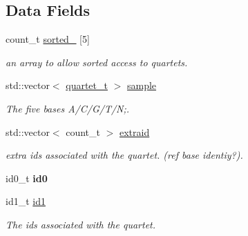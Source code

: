 \subsection*{Data Fields}
\begin{DoxyCompactItemize}
\item 
\hypertarget{classLocus_aa7e193d4069c91af62caf73cca14bb4a}{count\-\_\-t \hyperlink{classLocus_aa7e193d4069c91af62caf73cca14bb4a}{sorted\-\_\-} \mbox{[}5\mbox{]}}\label{classLocus_aa7e193d4069c91af62caf73cca14bb4a}

\begin{DoxyCompactList}\small\item\em an array to allow sorted access to quartets. \end{DoxyCompactList}\item 
\hypertarget{classLocus_aa80d7ff11dd7cffa958016494084f102}{std\-::vector$<$ \hyperlink{structquartet}{quartet\-\_\-t} $>$ \hyperlink{classLocus_aa80d7ff11dd7cffa958016494084f102}{sample}}\label{classLocus_aa80d7ff11dd7cffa958016494084f102}

\begin{DoxyCompactList}\small\item\em The five bases A/\-C/\-G/\-T/\-N;. \end{DoxyCompactList}\item 
\hypertarget{classLocus_a585fb7981a75e033fd9d74f86e9f7914}{std\-::vector$<$ count\-\_\-t $>$ \hyperlink{classLocus_a585fb7981a75e033fd9d74f86e9f7914}{extraid}}\label{classLocus_a585fb7981a75e033fd9d74f86e9f7914}

\begin{DoxyCompactList}\small\item\em extra ids associated with the quartet. (ref base identiy?). \end{DoxyCompactList}\item 
\hypertarget{classLocus_a7cec04f75b93910372c2a3054164d3c6}{id0\-\_\-t {\bfseries id0}}\label{classLocus_a7cec04f75b93910372c2a3054164d3c6}

\item 
\hypertarget{classLocus_a57dd7a335166403e09fb750a002aa8ee}{id1\-\_\-t \hyperlink{classLocus_a57dd7a335166403e09fb750a002aa8ee}{id1}}\label{classLocus_a57dd7a335166403e09fb750a002aa8ee}

\begin{DoxyCompactList}\small\item\em The ids associated with the quartet. \end{DoxyCompactList}\end{DoxyCompactItemize}


